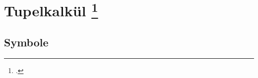 \documentclass{lehramt-informatik-haupt}
\begin{document}

\chapter{Tupelkalkül
\footcite[Seite 100-104]{kemper}}

%

\section{Symbole}
\end{document}
